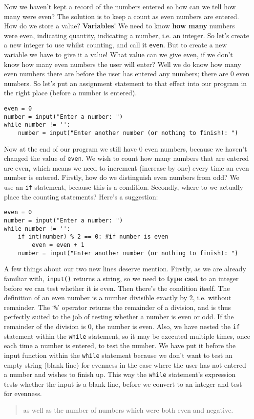 Now we haven't kept a record of the numbers entered so how can we   tell how many were even? The solution is to keep a count as even   numbers are entered. How do we store a value?   \textbf{Variables}! We need to know \textbf{how many}   numbers were even, indicating quantity, indicating a number, i.e. an   integer. So let's create a new integer to use whilst counting, and call   it \texttt{even}. But to create a new variable we have to give it a value!   What value can we give even, if we don't know how many even numbers the   user will enter? Well we do know how many even numbers there are before   the user has entered any numbers; there are 0 even numbers. So let's   put an assignment statement to that effect into our program in the   right place (before a number is entered).
\begin{lstlisting}
even = 0
number = input("Enter a number: ")
while number != '':
    number = input("Enter another number (or nothing to finish): ")
\end{lstlisting}

Now at the end of our program we still have 0 even numbers, because   we haven't changed the value of \texttt{even}. We wish to count how many   numbers that are entered are even, which means we need to increment   (increase by one) every time an even number is entered. Firstly, how do   we distinguish even numbers from odd? We use an \texttt{if} statement, because   this is a condition. Secondly, where to we actually place the counting   statements? Here's a suggestion:
\begin{lstlisting}
even = 0
number = input("Enter a number: ")
while number != '':
    if int(number) % 2 == 0: #if number is even
        even = even + 1
    number = input("Enter another number (or nothing to finish): ")
\end{lstlisting}

A few things about our two new lines deserve mention. Firstly, as we   are already familiar with, \texttt{input()} returns a string, so we need to   \textbf{type cast} to an integer before we can test whether it is even. Then   there's the condition itself. The definition of an even number is a   number divisible exactly by 2, i.e. without remainder. The `\texttt{\%}' operator   returns the remainder of a division, and is thus perfectly suited to   the job of testing whether a number is even or odd. If the remainder of   the division is 0, the number is even. Also, we have nested the \texttt{if}   statement within the \texttt{while} statement, so it may be executed multiple   times, once each time a number is entered, to test the number. We have   put it before the input function within the \texttt{while}   statement because we don't want to test an empty string (blank line)   for evenness in the case where the user has not entered a number and   wishes to finish up. This way the \texttt{while} statement's expression tests   whether the input is a blank line, before we convert to an integer and   test for evenness.
\begin{quotation}    as well as the number of numbers which were both even and negative.   
\end{quotation}

